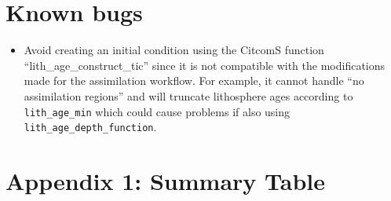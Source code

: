\documentclass[letterpaper,12pt]{article}
\begin{document}
\section{Known bugs}
\begin{itemize}
\item Avoid creating an initial condition using the CitcomS function ``lith\_age\_construct\_tic'' since it is not compatible with the modifications made for the assimilation workflow.  For example, it cannot handle ``no assimilation regions'' and will truncate lithosphere ages according to \verb#lith_age_min# which could cause problems if also using \verb#lith_age_depth_function#.
\end{itemize}




\section{Appendix 1: Summary Table}
\end{document}

